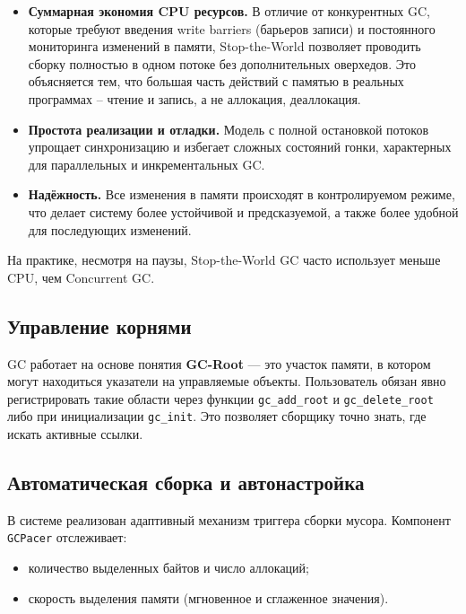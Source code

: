\begin{itemize}
    \item \textbf{Суммарная экономия CPU ресурсов.} В отличие от конкурентных GC, которые требуют введения write barriers (барьеров записи) и постоянного мониторинга изменений в памяти, Stop-the-World позволяет проводить сборку полностью в одном потоке без дополнительных оверхедов. Это объясняется тем, что большая часть действий с памятью в реальных программах -- чтение и запись, а не аллокация, деаллокация.
    \item \textbf{Простота реализации и отладки.} Модель с полной остановкой потоков упрощает синхронизацию и избегает сложных состояний гонки, характерных для параллельных и инкрементальных GC.
    \item \textbf{Надёжность.} Все изменения в памяти происходят в контролируемом режиме, что делает систему более устойчивой и предсказуемой, а также более удобной для последующих изменений.
\end{itemize}

На практике, несмотря на паузы, Stop-the-World GC часто использует меньше CPU, чем Concurrent GC.~\cite{gclinkedin}

\subsection{Управление корнями}

GC работает на основе понятия \textbf{GC-Root} — это участок памяти, в котором могут находиться указатели на управляемые объекты. Пользователь обязан явно регистрировать такие области через функции \texttt{gc\_add\_root} и \texttt{gc\_delete\_root} либо при инициализации \texttt{gc\_init}. Это позволяет сборщику точно знать, где искать активные ссылки.

\subsection{Автоматическая сборка и автонастройка}

В системе реализован адаптивный механизм триггера сборки мусора. Компонент \\\texttt{GCPacer} отслеживает:
\begin{itemize}
    \item количество выделенных байтов и число аллокаций;
    \item скорость выделения памяти (мгновенное и сглаженное значения).
\end{itemize}

